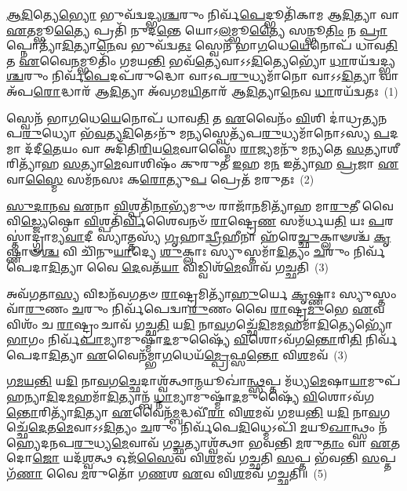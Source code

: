 \setcounter{anuvakam}{0}
\-\ul{𑌆}\-\-\ul{𑌦𑌿}\-𑌤𑍍𑌯𑍇\-\ul{𑌭𑍍𑌯𑍋} 𑌭𑍁𑌵᳴𑌦𑍍𑌵𑌦𑍍𑌭𑍍𑌯\-\ul{𑌶𑍍𑌚}\-𑌰𑍁𑌂 𑌨𑌿𑌰𑍍𑌵᳴\-\ul{𑌪𑍇}\-𑌦𑍍𑌭𑍂𑌤𑌿᳴𑌕𑌾𑌮 𑌆\-\ul{𑌦𑌿}\-𑌤𑍍𑌯𑌾 𑌵𑌾 \ul{𑌏}\-𑌤𑌮𑍍𑌭𑍂\-\ul{𑌤𑍍𑌯𑍈} 𑌪𑍍𑌰𑌤𑌿᳴ 𑌨𑍁𑌦\-\ul{𑌨𑍍𑌤𑍇} 𑌯𑍋\-𑌽\-\ul{𑌲}\-𑌮𑍍𑌭𑍂\-\ul{𑌤𑍍𑌯𑍈} 𑌸𑌨𑍍𑌭𑍂\-\ul{𑌤𑌿𑌂} 𑌨 \ul{𑌪𑍍𑌰𑌾}\-𑌪𑍍𑌨𑍋𑌤𑍍𑌯𑌾᳴\-\ul{𑌦𑌿}\-𑌤𑍍𑌯𑌾\-\ul{𑌨𑍇}\-𑌵 𑌭𑍁𑌵᳴𑌦𑍍𑌵\-\ul{𑌤𑌃} 𑌸𑍍𑌵𑍇𑌨᳴ 𑌭𑌾\-\ul{𑌗}\-𑌧𑍇\-\ul{𑌯𑍇}\-𑌨𑍋𑌪᳴ 𑌧𑌾𑌵\-\ul{𑌤𑌿} 𑌤 \ul{𑌏}\-𑌵𑍈\-\ul{𑌨}\-𑌮𑍍𑌭𑍂𑌤𑌿𑌂᳴ 𑌗𑌮𑌯\-\ul{𑌨𑍍𑌤𑌿} 𑌭𑌵᳴\-\ul{𑌤𑍍𑌯𑍇}\-𑌵𑌾𑌽𑌽\-\ul{𑌦𑌿}\-𑌤𑍍𑌯𑍇𑌭𑍍𑌯𑍋᳴ \ul{𑌧𑌾}\-𑌰𑌯᳴𑌦𑍍𑌵𑌦𑍍𑌭𑍍𑌯\-\ul{𑌶𑍍𑌚}\-𑌰𑍁𑌂 𑌨𑌿𑌰𑍍𑌵᳴\-\ul{𑌪𑍇}\-𑌦𑌪᳴𑌰𑍁𑌦𑍍𑌧𑍋 𑌵𑌾\-𑌽𑌪\-\ul{𑌰𑍁}\-𑌧𑍍𑌯𑌮𑌾᳴𑌨𑍋 𑌵𑌾\-𑌽\-𑌽\-\ul{𑌦𑌿}\-𑌤𑍍𑌯𑌾 𑌵𑌾 𑌅᳴𑌪\-\ul{𑌰𑍋}\-𑌦𑍍𑌧𑌾𑌰᳴ 𑌆\-\ul{𑌦𑌿}\-𑌤𑍍𑌯𑌾 𑌅᳴𑌵𑌗𑌮\-\ul{𑌯𑌿}\-𑌤𑌾𑌰᳴ 𑌆\-\ul{𑌦𑌿}\-𑌤𑍍𑌯𑌾\-\ul{𑌨𑍇}\-𑌵 \ul{𑌧𑌾}\-𑌰𑌯᳴𑌦𑍍𑌵𑌤𑌃~(1)

𑌸𑍍𑌵𑍇𑌨᳴ 𑌭𑌾\-\ul{𑌗}\-𑌧𑍇\-\ul{𑌯𑍇}\-𑌨𑍋𑌪᳴ 𑌧𑌾𑌵\-\ul{𑌤𑌿} 𑌤 \ul{𑌏}\-𑌵𑍈𑌨𑌂᳴ \ul{𑌵𑌿}\-𑌶𑌿 𑌦𑌾॑𑌧𑍍𑌰𑌤𑍍𑌯𑌨𑌪\-\ul{𑌰𑍁}\-𑌧𑍍𑌯𑍋 𑌭᳴\-\ul{𑌵}\-𑌤𑍍𑌯\-\ul{𑌦𑌿}\-𑌤𑍇\-𑌽𑌨𑍁᳴ 𑌮\-\ul{𑌨𑍍𑌯}\-𑌸𑍍𑌵𑍇𑌤𑍍𑌯᳴𑌪\-\ul{𑌰𑍁}\-𑌧𑍍𑌯𑌮𑌾᳴𑌨𑍋\-𑌽𑌸𑍍𑌯 \ul{𑌪}\-𑌦𑌮𑌾 𑌦᳴𑌦𑍀\-\ul{𑌤𑍇}\-𑌯𑌂 𑌵𑌾 𑌅𑌦𑌿᳴𑌤𑌿\-\ul{𑌰𑌿}\-𑌯\-\ul{𑌮𑍇}\-𑌵𑌾𑌸𑍍𑌮𑍈᳴ \ul{𑌰𑌾}\-𑌜𑍍𑌯𑌮𑌨𑍁᳴ 𑌮𑌨𑍍𑌯𑌤𑍇 \ul{𑌸}\-𑌤𑍍𑌯𑌾𑌶𑍀𑌰𑌿𑌤𑍍𑌯𑌾᳴𑌹 \ul{𑌸}\-𑌤𑍍𑌯𑌾\-\ul{𑌮𑍇}\-𑌵𑌾𑌶𑌿𑌷𑌂᳴ 𑌕𑍁𑌰𑍁𑌤 \ul{𑌇}\-𑌹 𑌮\-\ul{𑌨} 𑌇𑌤𑍍𑌯𑌾᳴𑌹 \ul{𑌪𑍍𑌰}\-𑌜𑌾 \ul{𑌏}\-𑌵𑌾\-\ul{𑌸𑍍𑌮𑍈} 𑌸𑌮᳴𑌨𑌸𑌃 𑌕\-\ul{𑌰𑍋}\-𑌤𑍍𑌯𑍁\-\ul{𑌪} 𑌪𑍍𑌰𑍇𑌤᳴ 𑌮𑌰𑍁𑌤𑌃~(2)

\-\ul{𑌸𑍁}\-\-\ul{𑌦𑌾}\-\-\ul{𑌨}\-\-\ul{𑌵} \ul{𑌏}\-𑌨𑌾 \ul{𑌵𑌿}\-𑌶𑍍𑌪𑌤𑌿᳴\-\ul{𑌨𑌾}\-𑌭𑍍𑌯᳴𑌮𑍁𑍞 𑌰𑌾𑌜𑌾᳴\-\ul{𑌨}\-𑌮𑌿𑌤𑍍𑌯𑌾᳴𑌹 𑌮𑌾\-\ul{𑌰𑍁}\-𑌤𑍀 𑌵𑍈 𑌵𑌿\-\ul{𑌡𑍍𑌜𑍍𑌯𑍇}\-𑌷𑍍𑌠𑍋 \ul{𑌵𑌿}\-𑌶𑍍𑌪𑌤𑌿᳴\-\ul{𑌰𑍍𑌵𑌿}\-𑌶𑍈𑌵𑌨𑍞᳴ \ul{𑌰𑌾}\-𑌷𑍍𑌟𑍍𑌰𑍇\-\ul{𑌣} 𑌸𑌮᳴𑌰𑍍𑌧𑌯\-\ul{𑌤𑌿} 𑌯𑌃 \ul{𑌪}\-𑌰𑌸𑍍𑌤𑌾॑𑌦𑍍𑌗𑍍𑌰𑌾𑌮𑍍𑌯\-\ul{𑌵𑌾}\-𑌦𑍀 𑌸𑍍𑌯𑌾𑌤𑍍𑌤𑌸𑍍𑌯᳴ \ul{𑌗𑍃}\-𑌹𑌾\-\ul{𑌦𑍍𑌵𑍍𑌰𑍀}\-𑌹𑍀𑌨𑌾 𑌹᳴𑌰𑍇\-\ul{𑌚𑍍𑌛𑍁}\-𑌕𑍍𑌲𑌾𑍟𑌶𑍍𑌚᳴ \ul{𑌕𑍃}\-𑌷𑍍𑌣𑌾𑍟\-\ul{𑌶𑍍𑌚} 𑌵𑌿 𑌚𑌿᳴𑌨𑍁\-\ul{𑌯𑌾}\-𑌦𑍍𑌯𑍇 \ul{𑌶𑍁}\-𑌕𑍍𑌲𑌾𑌃 𑌸𑍍𑌯𑍁𑌸𑍍𑌤𑌮𑌾᳴\-\ul{𑌦𑌿}\-𑌤𑍍𑌯𑌂 \ul{𑌚}\-𑌰𑍁𑌂 𑌨𑌿𑌰𑍍𑌵᳴𑌪𑍇𑌦𑌾\-\ul{𑌦𑌿}\-𑌤𑍍𑌯𑌾 𑌵𑍈 \ul{𑌦𑍇}\-𑌵𑌤᳴\-\ul{𑌯𑌾} 𑌵𑌿𑌡𑍍𑌵𑌿𑌶᳴\-\ul{𑌮𑍇}\-𑌵𑌾𑌵᳴ 𑌗𑌚𑍍𑌛𑌤𑌿~(3)

𑌅𑌵᳴𑌗𑌤𑌾\-\ul{𑌸𑍍𑌯} 𑌵𑌿𑌡𑌨᳴𑌵𑌗𑌤𑍞 \ul{𑌰𑌾}\-𑌷𑍍𑌟𑍍𑌰𑌮𑌿𑌤𑍍𑌯𑌾᳴\-\ul{𑌹𑍁}\-𑌰𑍍𑌯𑍇 \ul{𑌕𑍃}\-𑌷𑍍𑌣𑌾𑌃 𑌸𑍍𑌯𑍁𑌸𑍍𑌤𑌂 𑌵𑌾᳴\-\ul{𑌰𑍁}\-𑌣𑌂 \ul{𑌚}\-𑌰𑍁𑌂 𑌨𑌿𑌰𑍍𑌵᳴𑌪𑍇𑌦𑍍𑌵𑌾\-\ul{𑌰𑍁}\-𑌣𑌂 𑌵𑍈 \ul{𑌰𑌾}\-𑌷𑍍𑌟𑍍𑌰\-\ul{𑌮𑍁}\-𑌭𑍇 \ul{𑌏}\-𑌵 𑌵𑌿𑌶𑌂᳴ 𑌚 \ul{𑌰𑌾}\-𑌷𑍍𑌟𑍍𑌰𑌂 𑌚𑌾𑌵᳴ 𑌗𑌚𑍍𑌛\-\ul{𑌤𑌿} 𑌯\-\ul{𑌦𑌿} 𑌨𑌾\-\ul{𑌵}\-𑌗𑌚𑍍𑌛𑍇᳴\-\ul{𑌦𑌿}\-𑌮\-\ul{𑌮}\-𑌹𑌮𑌾᳴\-\ul{𑌦𑌿}\-𑌤𑍍𑌯𑍇𑌭𑍍𑌯𑍋᳴ \ul{𑌭𑌾}\-𑌗𑌂 𑌨𑌿𑌰𑍍𑌵᳴\-\ul{𑌪𑌾}\-𑌮𑍍𑌯𑌾𑌮𑍁𑌷𑍍𑌮𑌾᳴\-\ul{𑌦}\-𑌮𑍁𑌷𑍍𑌯𑍈᳴ \ul{𑌵𑌿}\-𑌶𑍋\-𑌽𑌵᳴𑌗\-\ul{𑌨𑍍𑌤𑍋}\-𑌰𑌿\-\ul{𑌤𑌿} 𑌨𑌿𑌰𑍍𑌵᳴𑌪𑍇𑌦𑌾\-\ul{𑌦𑌿}\-𑌤𑍍𑌯𑌾 \ul{𑌏}\-𑌵𑍈𑌨᳴𑌮𑍍𑌭𑌾\-\ul{𑌗}\-𑌧𑍇𑌯᳴\-\ul{𑌮𑍍𑌪𑍍𑌰𑍇}\-𑌫𑍍𑌸\-\ul{𑌨𑍍𑌤𑍋} 𑌵𑌿\-\ul{𑌶}\-𑌮𑌵᳴~(3)

\-\ul{𑌗}\-\-\ul{𑌮}\-\-\ul{𑌯}\-\-\ul{𑌨𑍍𑌤𑌿} 𑌯\-\ul{𑌦𑌿} 𑌨𑌾\-\ul{𑌵}\-𑌗\-\ul{𑌚𑍍𑌛𑍇}\-𑌦𑌾𑌶𑍍𑌵᳴𑌤𑍍𑌥𑌾\-\ul{𑌨𑍍𑌮}\-𑌯𑍂𑌖𑌾॑\-\ul{𑌨𑍍𑌥𑍍𑌸}\-𑌪𑍍𑌤 𑌮᳴𑌧𑍍𑌯\-\ul{𑌮𑍇}\-𑌷𑌾\-\ul{𑌯𑌾}\-𑌮𑍁𑌪᳴ 𑌹𑌨𑍍𑌯𑌾\-\ul{𑌦𑌿}\-𑌦\-\ul{𑌮}\-𑌹𑌮𑌾᳴\-\ul{𑌦𑌿}\-𑌤𑍍𑌯𑌾𑌨𑍍𑌬᳴\-\ul{𑌧𑍍𑌨𑌾}\-𑌮𑍍𑌯𑌾𑌮𑍁𑌷𑍍𑌮𑌾᳴\-\ul{𑌦}\-𑌮𑍁𑌷𑍍𑌯𑍈᳴ \ul{𑌵𑌿}\-𑌶𑍋\-𑌽𑌵᳴𑌗\-\ul{𑌨𑍍𑌤𑍋}\-𑌰𑌿𑌤𑍍𑌯𑌾᳴\-\ul{𑌦𑌿}\-𑌤𑍍𑌯𑌾 \ul{𑌏}\-𑌵𑍈𑌨᳴\-\ul{𑌮𑍍𑌬}\-𑌦𑍍𑌧𑌵𑍀᳴\-\ul{𑌰𑌾} 𑌵𑌿\-\ul{𑌶}\-𑌮𑌵᳴ 𑌗𑌮𑌯\-\ul{𑌨𑍍𑌤𑌿} 𑌯\-\ul{𑌦𑌿} 𑌨𑌾\-\ul{𑌵}\-𑌗𑌚𑍍𑌛𑍇᳴\-\ul{𑌦𑍇}\-𑌤\-\ul{𑌮𑍇}\-𑌵𑌾𑌽𑌽\-\ul{𑌦𑌿}\-𑌤𑍍𑌯𑌂 \ul{𑌚}\-𑌰𑍁𑌂 𑌨𑌿𑌰𑍍𑌵᳴𑌪𑍇\-\ul{𑌦𑌿}\-𑌧𑍍𑌮𑍇\-𑌽𑌪𑌿᳴ \ul{𑌮}\-𑌯𑍂\-\ul{𑌖𑌾}\-𑌨𑍍𑌥𑍍𑌸𑌂 𑌨᳴𑌹𑍍𑌯𑍇𑌦𑌨𑌪\-\ul{𑌰𑍁}\-𑌧𑍍𑌯\-\ul{𑌮𑍇}\-𑌵𑌾𑌵᳴ 𑌗\-\ul{𑌚𑍍𑌛}\-𑌤𑍍𑌯𑌾𑌶𑍍𑌵᳴𑌤𑍍𑌥𑌾 𑌭𑌵𑌨𑍍𑌤𑌿 \ul{𑌮}\-𑌰𑍁\-\ul{𑌤𑌾𑌂} 𑌵𑌾 \ul{𑌏}\-𑌤𑌦𑍋\-\ul{𑌜𑍋} 𑌯𑌦᳴\-\ul{𑌶𑍍𑌵}\-𑌤𑍍𑌥 𑌓𑌜᳴\-\ul{𑌸𑍈}\-𑌵 𑌵𑌿\-\ul{𑌶}\-𑌮𑌵᳴ 𑌗𑌚𑍍𑌛𑌤𑌿 \ul{𑌸}\-𑌪𑍍𑌤 𑌭᳴𑌵𑌨𑍍𑌤𑌿 \ul{𑌸}\-𑌪𑍍𑌤𑌗᳴\-\ul{𑌣𑌾} 𑌵𑍈 \ul{𑌮}\-𑌰𑍁𑌤𑍋᳴ 𑌗\-\ul{𑌣}\-𑌶 \ul{𑌏}\-𑌵 𑌵𑌿\-\ul{𑌶}\-𑌮𑌵᳴ 𑌗𑌚𑍍𑌛𑌤𑌿॥~(5)

